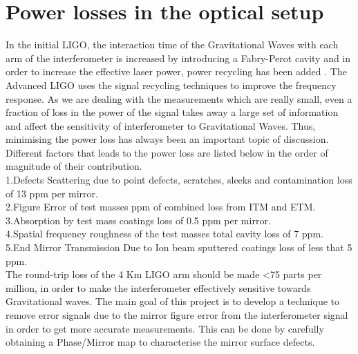 \documentclass[colorlinks=true,pdfstartview=FitV,linkcolor=blue,
            citecolor=red,urlcolor=magenta]{ligodoc}
\begin{document}
\section{Power losses in the optical setup}
 In the initial LIGO, the interaction time of the Gravitational Waves with each arm of the interferometer is increased by introducing a Fabry-Perot cavity and in order to increase the effective laser power, power recycling has been added \cite{powerloss}. The Advanced LIGO uses the signal recycling techniques to improve the frequency response. As we are dealing with the measurements which are really small, even a fraction of loss in the power of the signal takes away a large set of information and affect the sensitivity of interferometer to Gravitational Waves. Thus, minimising the power loss has always been an important topic of discussion. Different factors that leads to the power loss are listed below in the order of magnitude of their contribution.
 \vspace{5mm}
\\1.Defects \textendash Scattering due to point defects, scratches, sleeks and contamination \textendash loss of 13 ppm per mirror.
\\2.Figure Error of test masses  ppm of combined loss from ITM and ETM.
\\3.Absorption by test mass coatings \textendash loss of 0.5 ppm per mirror.
\\4.Spatial frequency roughness of the test masses \textendash total cavity loss of 7 ppm.
\\5.End Mirror Transmission \textendash Due to Ion beam sputtered coatings \textendash loss of less that 5 ppm.
\vspace{5mm}
\\The round-trip loss of the 4 Km LIGO arm should be made \textless 75 parts per million, in order to make the interferometer effectively sensitive towards Gravitational waves. The main goal of this project is to develop a technique to remove error signals due to the mirror figure error from the interferometer signal in order to get more accurate measurements. This can be done by carefully obtaining a Phase/Mirror map to characterise the mirror surface defects.
\end{document}
